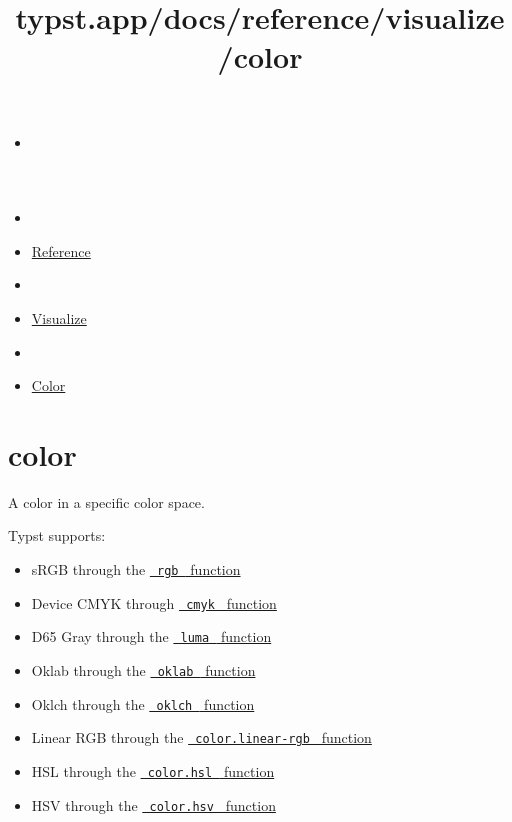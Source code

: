 \title{typst.app/docs/reference/visualize/color}

\begin{itemize}
\tightlist
\item
  \href{/docs}{}
\item
  
\item
  \href{/docs/reference/}{Reference}
\item
  
\item
  \href{/docs/reference/visualize/}{Visualize}
\item
  
\item
  \href{/docs/reference/visualize/color/}{Color}
\end{itemize}

\section{\texorpdfstring{{ color }}{ color }}\label{summary}

A color in a specific color space.

Typst supports:

\begin{itemize}
\tightlist
\item
  sRGB through the
  \href{/docs/reference/visualize/color/\#definitions-rgb}{\texttt{\ rgb\ }
  function}
\item
  Device CMYK through
  \href{/docs/reference/visualize/color/\#definitions-cmyk}{\texttt{\ cmyk\ }
  function}
\item
  D65 Gray through the
  \href{/docs/reference/visualize/color/\#definitions-luma}{\texttt{\ luma\ }
  function}
\item
  Oklab through the
  \href{/docs/reference/visualize/color/\#definitions-oklab}{\texttt{\ oklab\ }
  function}
\item
  Oklch through the
  \href{/docs/reference/visualize/color/\#definitions-oklch}{\texttt{\ oklch\ }
  function}
\item
  Linear RGB through the
  \href{/docs/reference/visualize/color/\#definitions-linear-rgb}{\texttt{\ color.linear-rgb\ }
  function}
\item
  HSL through the
  \href{/docs/reference/visualize/color/\#definitions-hsl}{\texttt{\ color.hsl\ }
  function}
\item
  HSV through the
  \href{/docs/reference/visualize/color/\#definitions-hsv}{\texttt{\ color.hsv\ }
  function}
\end{itemize}

